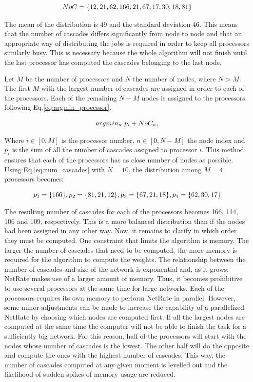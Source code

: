 \documentclass[11pt]{article}
\begin{document}
\begin{equation}
	\centering
	NoC = \{12, 21, 62, 166, 21, 67, 17, 30, 18, 81\}
	\label{eq:num_cascades}
\end{equation}

The mean of the distribution is 49 and the standard deviation 46. This means that the number of cascades differs significantly from node to node and that an appropriate way of distributing the jobs is required in order to keep all processors similarly busy. This is necessary because the whole algorithm will not finish until the last processor has computed the cascades belonging to the last node. 

Let \(M\) be the number of processors and \(N\) the number of nodes, where \(N > M\). The first \(M\) with the largest number of cascades are assigned in order to each of the processors. Each of the remaining \(N-M\) nodes is assigned to the processors following Eq.\ref{eq:argmin_processor}.

\begin{equation}
	\centering
	argmin_{n} \text{ } p_{i} + NoC_{n}, 
	\label{eq:argmin_processor}
\end{equation}

Where \(i \in [0,M]\) is the processor number, \(n \in [0, N - M]\) the node index and \(p_{i}\) is the sum of all the number of cascades assigned to processor \(i\). This method ensures that each of the processors has as close number of nodes as possible. Using Eq.\ref{eq:num_cascades} with \(N=10\), the distribution among \(M = 4\) processors becomes:

\begin{equation}
	\centering
	p_{1} = \{166\}, p_{2} = \{81, 21, 12\}, p_{3} = \{67, 21, 18\}, p_{4} = \{62, 30, 17\}
	\label{eq:distribution_processors}
\end{equation}

The resulting number of cascades for each of the processors becomes 166, 114, 106 and 109, respectively. This is a more balanced distribution than if the nodes had been assigned in any other way. 
Now, it remains to clarify in which order they must be computed. One constraint that limits the algorithm is memory. The larger the number of cascades that need to be computed, the more memory is required for the algorithm to compute the weights. The relationship between the number of cascades and size of the network is exponential and, as it grows, NetRate makes use of a larger amount of memory. Thus, it becomes prohibitive to use several processors at the same time for large networks. Each of the processors requires its own memory to perform NetRate in parallel. However, some minor adjustments can be made to increase the capability of a parallelized NetRate by choosing which nodes are computed first. If all the largest nodes are computed at the same time the computer will not be able to finish the task for a sufficiently big network. For this reason, half of the processors will start with the nodes whose number of cascades is the lowest. The other half will do the opposite and compute the ones with the highest number of cascades. This way, the number of cascades computed at any given moment is levelled out and the likelihood of sudden spikes of memory usage are reduced. 
\end{document}
